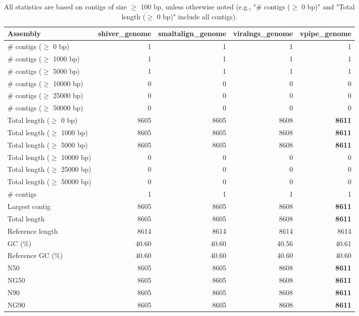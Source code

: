 \documentclass[12pt,a4paper]{article}
\begin{document}
\begin{table}[ht]
\begin{center}
\caption{All statistics are based on contigs of size $\geq$ 100 bp, unless otherwise noted (e.g., "\# contigs ($\geq$ 0 bp)" and "Total length ($\geq$ 0 bp)" include all contigs).}
\begin{tabular}{|l*{4}{|r}|}
\hline
Assembly & shiver\_genome & smaltalign\_genome & viralngs\_genome & vpipe\_genome \\ \hline
\# contigs ($\geq$ 0 bp) & 1 & 1 & 1 & 1 \\ \hline
\# contigs ($\geq$ 1000 bp) & 1 & 1 & 1 & 1 \\ \hline
\# contigs ($\geq$ 5000 bp) & 1 & 1 & 1 & 1 \\ \hline
\# contigs ($\geq$ 10000 bp) & 0 & 0 & 0 & 0 \\ \hline
\# contigs ($\geq$ 25000 bp) & 0 & 0 & 0 & 0 \\ \hline
\# contigs ($\geq$ 50000 bp) & 0 & 0 & 0 & 0 \\ \hline
Total length ($\geq$ 0 bp) & 8605 & 8605 & 8608 & {\bf 8611} \\ \hline
Total length ($\geq$ 1000 bp) & 8605 & 8605 & 8608 & {\bf 8611} \\ \hline
Total length ($\geq$ 5000 bp) & 8605 & 8605 & 8608 & {\bf 8611} \\ \hline
Total length ($\geq$ 10000 bp) & 0 & 0 & 0 & 0 \\ \hline
Total length ($\geq$ 25000 bp) & 0 & 0 & 0 & 0 \\ \hline
Total length ($\geq$ 50000 bp) & 0 & 0 & 0 & 0 \\ \hline
\# contigs & 1 & 1 & 1 & 1 \\ \hline
Largest contig & 8605 & 8605 & 8608 & {\bf 8611} \\ \hline
Total length & 8605 & 8605 & 8608 & {\bf 8611} \\ \hline
Reference length & 8614 & 8614 & 8614 & 8614 \\ \hline
GC (\%) & 40.60 & 40.60 & 40.56 & 40.61 \\ \hline
Reference GC (\%) & 40.60 & 40.60 & 40.60 & 40.60 \\ \hline
N50 & 8605 & 8605 & 8608 & {\bf 8611} \\ \hline
NG50 & 8605 & 8605 & 8608 & {\bf 8611} \\ \hline
N90 & 8605 & 8605 & 8608 & {\bf 8611} \\ \hline
NG90 & 8605 & 8605 & 8608 & {\bf 8611} \\ \hline

\end{tabular}
\end{center}
\end{table}
\end{document}
